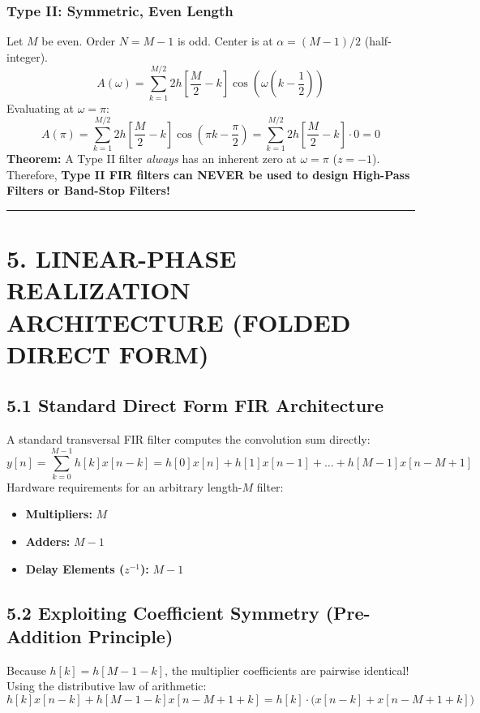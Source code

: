 \documentclass[11pt,a4paper]{article}
\begin{document}
\subsubsection{Type II: Symmetric, Even Length}
Let $M$ be even. Order $N = M-1$ is odd. Center is at $\alpha = (M-1)/2$ (half-integer).
\begin{equation}
A(\omega) = \sum_{k=1}^{M/2} 2 h\left[\frac{M}{2} - k\right] \cos\left(\omega\left(k - \frac{1}{2}\right)\right)
\end{equation}
Evaluating at $\omega = \pi$:
\begin{equation}
A(\pi) = \sum_{k=1}^{M/2} 2 h\left[\frac{M}{2} - k\right] \cos\left(\pi k - \frac{\pi}{2}\right) = \sum_{k=1}^{M/2} 2 h\left[\frac{M}{2} - k\right] \cdot 0 = 0
\end{equation}
\textbf{Theorem:} A Type II filter \textit{always} has an inherent zero at $\omega = \pi$ ($z = -1$). Therefore, \textbf{Type II FIR filters can NEVER be used to design High-Pass Filters or Band-Stop Filters!}

\noindent\rule{\textwidth}{0.5pt}

\section{5. LINEAR-PHASE REALIZATION ARCHITECTURE (FOLDED DIRECT FORM)}

\subsection{5.1 Standard Direct Form FIR Architecture}
A standard transversal FIR filter computes the convolution sum directly:
\begin{equation}
y[n] = \sum_{k=0}^{M-1} h[k] x[n-k] = h[0]x[n] + h[1]x[n-1] + \dots + h[M-1]x[n - M + 1]
\end{equation}
Hardware requirements for an arbitrary length-$M$ filter:
\begin{itemize}
    \item \textbf{Multipliers:} $M$
    \item \textbf{Adders:} $M - 1$
    \item \textbf{Delay Elements ($z^{-1}$):} $M - 1$
\end{itemize}

\subsection{5.2 Exploiting Coefficient Symmetry (Pre-Addition Principle)}
Because $h[k] = h[M - 1 - k]$, the multiplier coefficients are pairwise identical! Using the distributive law of arithmetic:
\begin{equation}
h[k] x[n-k] + h[M-1-k] x[n - M + 1 + k] = h[k] \cdot \Big( x[n-k] + x[n - M + 1 + k] \Big)
\end{equation}
\end{document}
